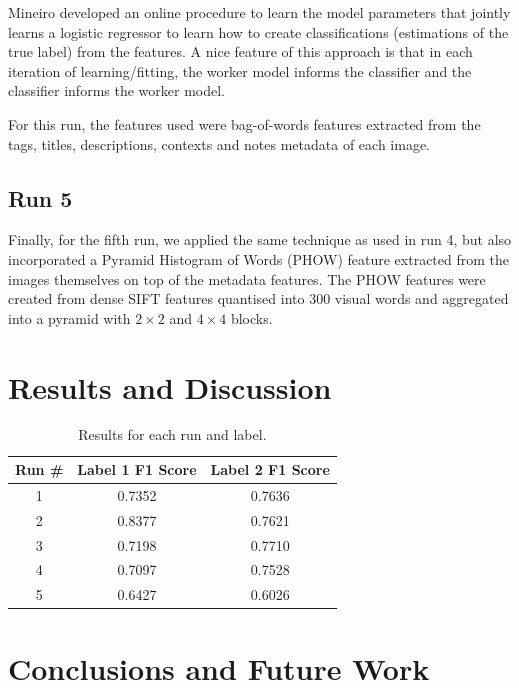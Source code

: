 \documentclass{../acm_proc_article-me11_tweaked}
\begin{document}
Mineiro developed an online procedure to learn the model parameters that jointly learns a logistic regressor to learn how to create classifications (estimations of the true label) from the features. A nice feature of this approach is that in each iteration of learning/fitting, the worker model informs the classifier and the classifier informs the worker model.

For this run, the features used were bag-of-words features extracted from the tags, titles, descriptions, contexts and notes metadata of each image.

\subsection{Run 5}
Finally, for the fifth run, we applied the same technique as used in run 4, but also incorporated a Pyramid Histogram of Words (PHOW) feature extracted from the images themselves on top of the metadata features. The PHOW features were created from dense SIFT features quantised into 300 visual words and aggregated into a pyramid with $2{\times}2$ and $4{\times}4$ blocks.

\section{Results and Discussion}

\begin{table}
	\centering
	\caption{\label{tab:results}Results for each run and label.}
	\begin{tabular}{|c|c|c|}
		\hline
		Run \# & Label 1 F1 Score & Label 2 F1 Score \\ \hline \hline
		1 & 0.7352 & 0.7636 \\ \hline
		2 & 0.8377 & 0.7621 \\ \hline
		3 & 0.7198 & 0.7710 \\ \hline
		4 & 0.7097 & 0.7528 \\ \hline
		5 & 0.6427 & 0.6026 \\ \hline
	\end{tabular}
\end{table}


\section{Conclusions and Future Work}



\end{document}

